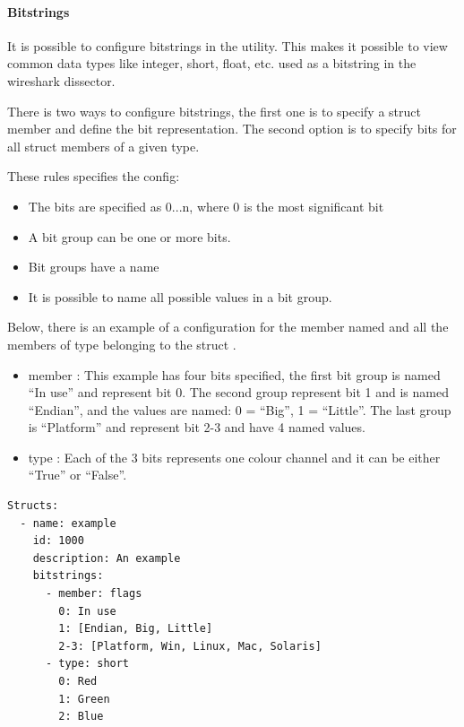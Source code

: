 \documentclass[A4paper,10pt,english]{sphinxmanual}
\begin{document}
\paragraph{Bitstrings}
\label{user/config:bitstrings}
It is possible to configure bitstrings in the utility. This makes it possible to view common data types like integer, short, float, etc. used as a bitstring in the wireshark dissector.

There is two ways to configure bitstrings, the first one is to specify a struct member and define the bit representation. The second option is to specify bits for all struct members of a given type.

These rules specifies the config:
\begin{itemize}
\item {} 
The bits are specified as 0...n, where 0 is the most significant bit

\item {} 
A bit group can be one or more bits.

\item {} 
Bit groups have a name

\item {} 
It is possible to name all possible values in a bit group.

\end{itemize}

Below, there is an example of a configuration for the member named  and all the members of  type belonging to the struct .
\begin{itemize}
\item {} 
member : This example has four bits specified, the first bit group is named ``In use'' and represent bit 0. The second group represent bit 1 and is named ``Endian'', and the values are named: 0 = ``Big'', 1 = ``Little''. The last group is ``Platform'' and represent bit 2-3 and have 4 named values.

\item {} 
type : Each of the 3 bits represents one colour channel and it can be either ``True'' or ``False''.

\end{itemize}

\begin{Verbatim}[commandchars=\\\{\}]
Structs:
  - name: example
    id: 1000
    description: An example
    bitstrings:
      - member: flags
        0: In use
        1: [Endian, Big, Little]
        2-3: [Platform, Win, Linux, Mac, Solaris]
      - type: short
        0: Red
        1: Green
        2: Blue
\end{Verbatim}
\end{document}
